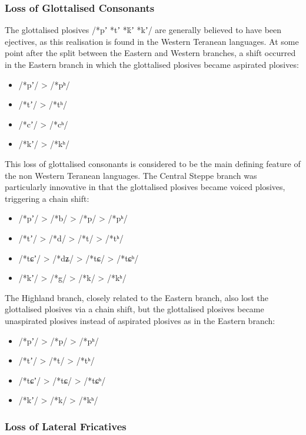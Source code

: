 \documentclass[grammar]{subfiles}
\begin{document}
\subsubsection{Loss of Glottalised Consonants}
\label{sssec:history:east:glottalised}

The glottalised plosives /*pʼ *tʼ *ḱʼ *kʼ/ are generally believed to have been
ejectives, as this realisation is found in the Western Teranean languages.  At
some point after the split between the Eastern and Western branches, a shift
occurred in the Eastern branch in which the glottalised plosives became
aspirated plosives:

\begin{itemize}
  \item /*pʼ/ > /*pʰ/  
  \item /*tʼ/ > /*tʰ/  
  \item /*cʼ/ > /*cʰ/  
  \item /*kʼ/ > /*kʰ/  
\end{itemize}

This loss of glottalised consonants is considered to be the main defining
feature of the non Western Teranean languages.  The Central Steppe branch was
particularly innovative in that the glottalised plosives became voiced
plosives, triggering a chain shift:

\begin{itemize}
  \item /*pʼ/ > /*b/ > /*p/ > /*pʰ/  
  \item /*tʼ/ > /*d/ > /*t/ > /*tʰ/  
  \item /*tɕʼ/ > /*dʑ/ > /*tɕ/ > /*tɕʰ/  
  \item /*kʼ/ > /*g/ > /*k/ > /*kʰ/  
\end{itemize}

The Highland branch, closely related to the Eastern branch, also lost the
glottalised plosives via a chain shift, but the glottalised plosives became unaspirated
plosives instead of aspirated plosives as in the Eastern branch:

\begin{itemize}
  \item /*pʼ/ > /*p/ > /*pʰ/  
  \item /*tʼ/ > /*t/ > /*tʰ/  
  \item /*tɕʼ/ > /*tɕ/ > /*tɕʰ/  
  \item /*kʼ/ > /*k/ > /*kʰ/  
\end{itemize}

\subsubsection{Loss of Lateral Fricatives}
\label{sssec:history:east:lateral}
\end{document}
